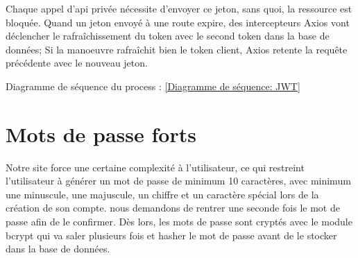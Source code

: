 Chaque appel d'api privée nécessite d'envoyer ce jeton, sans quoi, la ressource est bloquée. Quand un jeton envoyé à une route expire, des intercepteurs Axios vont déclencher le rafraîchissement du token avec le second token dans la base de données; Si la manoeuvre rafraîchit bien le token client, Axios retente la requête précédente avec le nouveau jeton.

Diagramme de séquence du process : \ref{Diagramme de séquence: JWT}

\section{Mots de passe forts}

Notre site force une certaine complexité à l'utilisateur, ce qui restreint l'utilisateur à générer un mot de passe de minimum 10 caractères, avec minimum une minuscule, une majuscule, un chiffre et un caractère spécial lors de la création de son compte. nous demandons de rentrer une seconde fois le mot de passe afin de le confirmer. 
Dès lors, les mots de passe sont cryptés avec le module bcrypt qui va saler plusieurs fois et hasher le mot de passe avant de le stocker dans la base de données.
